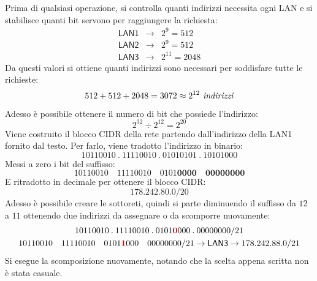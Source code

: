 \documentclass[a4paper]{article}
\newcommand{\binaryaddress}[4]{#1 \hspace{1em} #2 \hspace{1em} #3 \hspace{1em} #4}
\newcommand{\binaryaddresspointed}[4]{#1\:.\:#2\:.\:#3\:.\:#4}
\begin{document}
	\noindent
	Prima di qualsiasi operazione, si controlla quanti indirizzi necessita ogni \textsf{LAN} e si stabilisce quanti bit servono per raggiungere la richiesta:
	\begin{equation*}
		\begin{array}{lll}
			\textsf{LAN1} & \longrightarrow & 2^{9} = 512 \\
			\textsf{LAN2} & \longrightarrow & 2^{9} = 512 \\
			\textsf{LAN3} & \longrightarrow & 2^{11} = 2048 
		\end{array}
	\end{equation*}
	Da questi valori si ottiene quanti indirizzi sono necessari per soddisfare tutte le richieste:
	\begin{equation*}
		512 + 512 + 2048 = 3072 \approx 2^{12} \emph{ indirizzi}
	\end{equation*}
	Adesso è possibile ottenere il numero di bit che possiede l'indirizzo:
	\begin{equation*}
		2^{32} \div 2^{12} = 2^{20}
	\end{equation*}
	Viene costruito il blocco \textsf{CIDR} della rete partendo dall'indirizzo della \textsf{LAN1} fornito dal testo.\newline
	Per farlo, viene tradotto l'indirizzo in binario:
	\begin{equation*}
		\binaryaddresspointed{10110010}{11110010}{01010101}{10101000}
	\end{equation*}
	Messi a zero i bit del suffisso:
	\begin{equation*}
		\binaryaddress{10110010}{11110010}{0101\boldsymbol{0000}}{\boldsymbol{00000000}}
	\end{equation*}
	E ritradotto in decimale per ottenere il blocco \textsf{CIDR}:
	\begin{equation*}
		178.242.80.0/20
	\end{equation*}
	Adesso è possibile creare le sottoreti, quindi si parte diminuendo il suffisso da $12$ a $11$ ottenendo due indirizzi da assegnare o da scomporre nuovamente:
	\begin{gather*}
		\binaryaddresspointed{10110010}{11110010}{0101\textcolor{Red3}{\boldsymbol{0}}000}{00000000}/21 \\
		\binaryaddress{10110010}{11110010}{0101\textcolor{Red3}{\boldsymbol{1}}000}{00000000}/21 \rightarrow \textsf{LAN3} \rightarrow 178.242.88.0/21
	\end{gather*}
	Si esegue la scomposizione nuovamente, notando che la scelta appena scritta non è stata casuale.\newline
\end{document}
